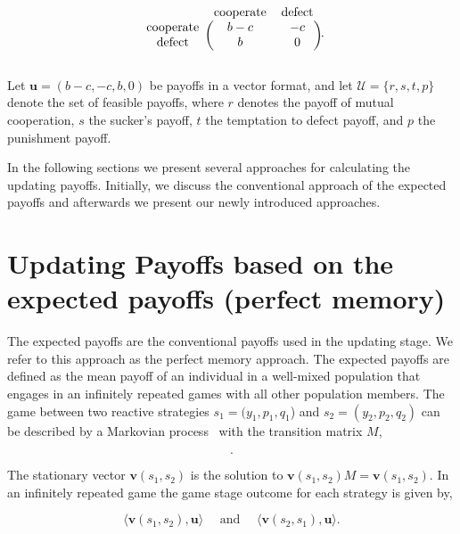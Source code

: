 \documentclass[11pt]{article}
\theoremstyle{plainCl1}
\theoremstyle{plainCl2}
\begin{document}
\begin{equation}
    \begin{blockarray}{ccc}
        & \text{cooperate} & \text{defect} \\
        \begin{block}{c(cc)}
            \text{cooperate} & b - c & -c \\
            \text{defect} & b & 0 \\
        \end{block}
    \end{blockarray}.
\end{equation}

Let \(\mathbf{u} = (b-c, -c, b, 0)\) be payoffs in a vector format, and let \(\mathcal{U}
= \{r, s, t, p\}\) denote the set of feasible payoffs, where \(r\) denotes the
payoff of mutual cooperation, \(s\) the sucker's payoff, \(t\) the temptation to
defect payoff, and \(p\) the punishment payoff.

In the following sections we present several approaches for calculating the
updating payoffs. Initially, we discuss the conventional approach of the
expected payoffs and afterwards we present our newly introduced approaches.

\section{Updating Payoffs based on the expected payoffs (perfect memory)}\label{section:perfect_memory}

The expected payoffs are the conventional payoffs used in the updating stage. We
refer to this approach as the perfect memory approach. The expected payoffs are
defined as the mean payoff of an individual in a well-mixed population that
engages in an infinitely repeated games with all other population members.
The game between two reactive strategies $s_1\!=\!(y_1, p_1, q_1$) and $s_2\!=\!(y_2,p_2,q_2)$
can be described by a Markovian process~\cite{nowak:APC:1989} with the
transition matrix \(M\),

\begin{equation}\label{eq:transition_matrix}
  .
\end{equation}

The stationary vector \(\mathbf{v}(s_1,s_2)\) is the solution to
\(\mathbf{v}(s_1,s_2) M = \mathbf{v}(s_1,s_2)\). In an infinitely repeated game
the game stage outcome for each strategy is given by,

\[\langle\mathbf{v}(s_1,s_2),\mathbf{u}\rangle \quad  \text{ and } \quad  \langle\mathbf{v}(s_2,s_1), \mathbf{u}\rangle.\]
\end{document}
